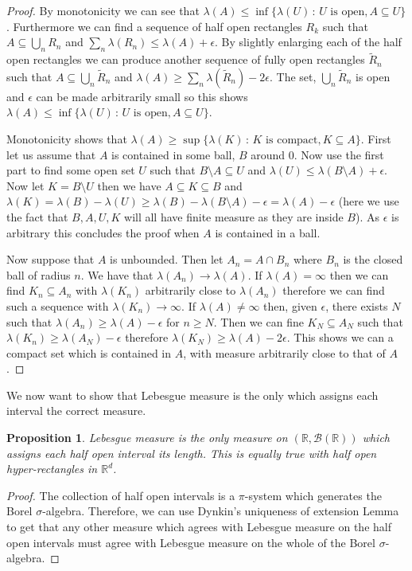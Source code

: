 \documentclass[11pt]{article}
\newtheorem{prp}[thm]{Proposition}
\theoremstyle{definition}
\theoremstyle{remark}
\begin{document}
\begin{proof}
By monotonicity we can see that $\lambda(A) \leq \inf \{ \lambda(U)\,:\, \mbox{$U$ is open}, A \subseteq U\}$. Furthermore we can find a sequence of half open rectangles $R_k$ such that $A \subseteq \bigcup_n R_n$ and $\sum_n \lambda(R_n) \leq \lambda(A) + \epsilon$. By slightly enlarging each of the half open rectangles we can produce another sequence of fully open rectangles $\tilde{R}_n$ such that $A \subseteq \bigcup_n \tilde{R}_n$ and $\lambda(A) \geq \sum_n \lambda(\tilde{R}_n)-2\epsilon$. The set, $\bigcup_n \tilde{R}_n$ is open and $\epsilon$ can be made arbitrarily small so this shows $\lambda(A) \leq \inf \{ \lambda(U)\,:\, \mbox{$U$ is open}, A \subseteq U\}$.

Monotonicity shows that $\lambda(A) \geq \sup \{ \lambda(K)\,:\, \mbox{$K$ is compact}, K \subseteq A\}$. First let us assume that $A$ is contained in some ball, $B$ around 0. Now use the first part to find some open set $U$ such that $B \setminus A \subseteq U$ and $\lambda(U) \leq \lambda(B \setminus A) + \epsilon$. Now let $K = B \setminus U$ then we have $A \subseteq K \subseteq B$ and $\lambda(K) = \lambda(B) - \lambda(U) \geq \lambda(B) - \lambda(B \setminus A) - \epsilon = \lambda(A) - \epsilon$ (here we use the fact that $B, A, U, K$ will all have finite measure as they are inside $B$). As $\epsilon$ is arbitrary this concludes the proof when $A$ is contained in a ball. 

Now suppose that $A$ is unbounded. Then let $A_n = A \cap B_n$ where $B_n$ is the closed ball of radius $n$. We have that $\lambda(A_n) \rightarrow \lambda(A)$. If $\lambda(A) = \infty$ then we can find $K_n \subseteq A_n$ with $\lambda(K_n)$ arbitrarily close to $\lambda(A_n)$ therefore we can find such a sequence with $\lambda(K_n) \rightarrow \infty$. If $\lambda(A) \neq \infty$ then, given $\epsilon$, there exists $N$ such that $\lambda(A_n) \geq \lambda(A)-\epsilon$ for $n \geq N$. Then we can fine $K_N \subseteq A_N$ such that $\lambda(K_n) \geq \lambda(A_N) - \epsilon$ therefore $\lambda(K_N) \geq \lambda(A)- 2 \epsilon$. This shows we can a compact set which is contained in $A$, with measure arbitrarily close to that of $A$. 
\end{proof}

We now want to show that Lebesgue measure is the only which assigns each interval the correct measure. 
\begin{prp}
Lebesgue measure is the only measure on $(\mathbb{R}, \mathcal{B}(\mathbb{R}))$ which assigns each half open interval its length. This is equally true with half open hyper-rectangles in $\mathbb{R}^d$.
\end{prp}
\begin{proof}
The collection of half open intervals is a $\pi$-system which generates the Borel $\sigma$-algebra. Therefore, we can use Dynkin's uniqueness of extension Lemma to get that any other measure which agrees with Lebesgue measure on the half open intervals must agree with Lebesgue measure on the whole of the Borel $\sigma$-algebra.
\end{proof}
\end{document}
